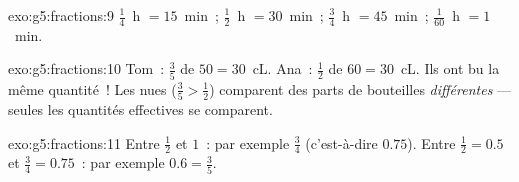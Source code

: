 \begin{solution}{exo:g5:fractions:9}
$\frac14$~h $= 15$~min~; $\frac12$~h $= 30$~min~; $\frac34$~h $=
45$~min~; $\frac{1}{60}$~h $= 1$~min.
\end{solution}

\begin{solution}{exo:g5:fractions:10}
Tom~: $\frac35$ de $50 = 30$~cL. Ana~: $\frac12$ de $60 = 30$~cL.
Ils ont bu la même quantité~! Les  nues
($\frac35 > \frac12$) comparent des parts de bouteilles
\emph{différentes} --- seules les quantités effectives se
comparent.
\end{solution}

\begin{solution}{exo:g5:fractions:11}
Entre $\frac12$ et $1$~: par exemple $\frac34$ (c'est-à-dire
$0.75$). Entre $\frac12 = 0.5$ et $\frac34 = 0.75$~: par exemple
$0.6 = \frac35$.
\end{solution}
